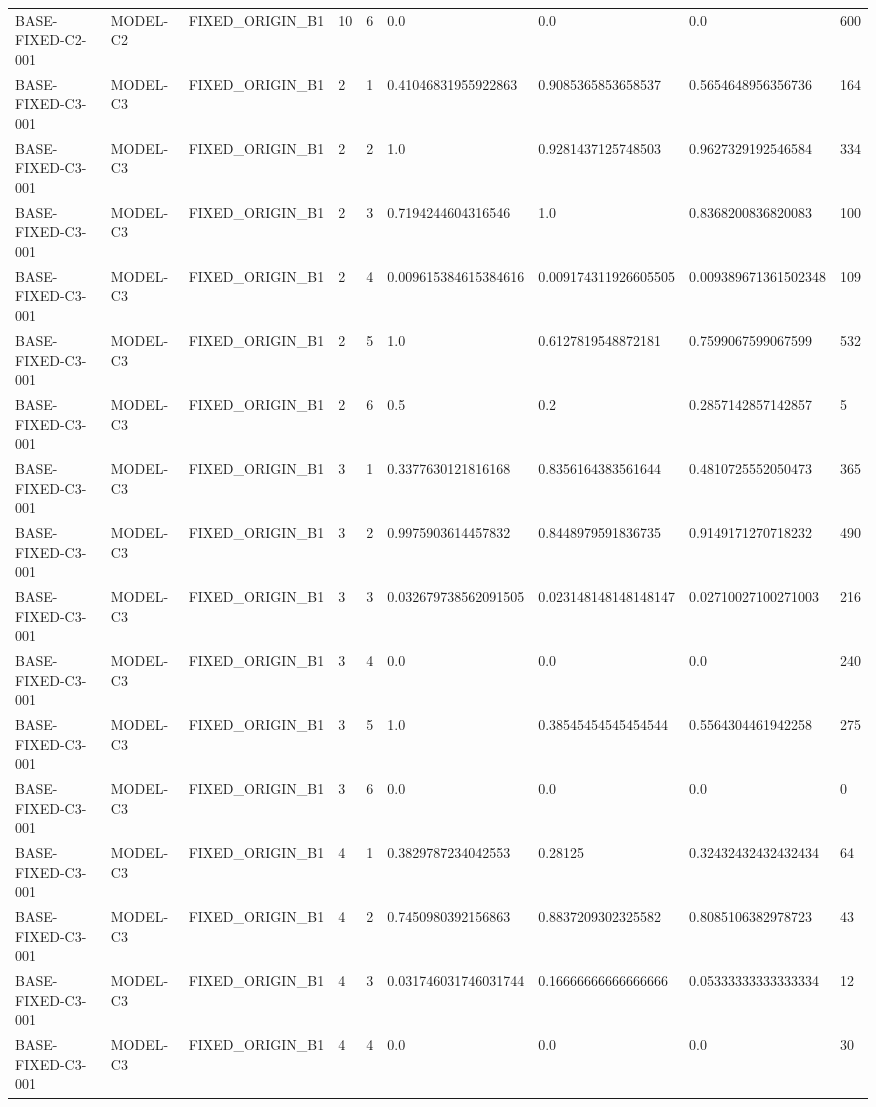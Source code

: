 \begin{tabular}{lllllllll}
BASE-FIXED-C2-001 & MODEL-C2 & FIXED\_ORIGIN\_B1 & 10 & 6 & 0.0 & 0.0 & 0.0 & 600 \\
BASE-FIXED-C3-001 & MODEL-C3 & FIXED\_ORIGIN\_B1 & 2 & 1 & 0.41046831955922863 & 0.9085365853658537 & 0.5654648956356736 & 164 \\
BASE-FIXED-C3-001 & MODEL-C3 & FIXED\_ORIGIN\_B1 & 2 & 2 & 1.0 & 0.9281437125748503 & 0.9627329192546584 & 334 \\
BASE-FIXED-C3-001 & MODEL-C3 & FIXED\_ORIGIN\_B1 & 2 & 3 & 0.7194244604316546 & 1.0 & 0.8368200836820083 & 100 \\
BASE-FIXED-C3-001 & MODEL-C3 & FIXED\_ORIGIN\_B1 & 2 & 4 & 0.009615384615384616 & 0.009174311926605505 & 0.009389671361502348 & 109 \\
BASE-FIXED-C3-001 & MODEL-C3 & FIXED\_ORIGIN\_B1 & 2 & 5 & 1.0 & 0.6127819548872181 & 0.7599067599067599 & 532 \\
BASE-FIXED-C3-001 & MODEL-C3 & FIXED\_ORIGIN\_B1 & 2 & 6 & 0.5 & 0.2 & 0.2857142857142857 & 5 \\
BASE-FIXED-C3-001 & MODEL-C3 & FIXED\_ORIGIN\_B1 & 3 & 1 & 0.3377630121816168 & 0.8356164383561644 & 0.4810725552050473 & 365 \\
BASE-FIXED-C3-001 & MODEL-C3 & FIXED\_ORIGIN\_B1 & 3 & 2 & 0.9975903614457832 & 0.8448979591836735 & 0.9149171270718232 & 490 \\
BASE-FIXED-C3-001 & MODEL-C3 & FIXED\_ORIGIN\_B1 & 3 & 3 & 0.032679738562091505 & 0.023148148148148147 & 0.02710027100271003 & 216 \\
BASE-FIXED-C3-001 & MODEL-C3 & FIXED\_ORIGIN\_B1 & 3 & 4 & 0.0 & 0.0 & 0.0 & 240 \\
BASE-FIXED-C3-001 & MODEL-C3 & FIXED\_ORIGIN\_B1 & 3 & 5 & 1.0 & 0.38545454545454544 & 0.5564304461942258 & 275 \\
BASE-FIXED-C3-001 & MODEL-C3 & FIXED\_ORIGIN\_B1 & 3 & 6 & 0.0 & 0.0 & 0.0 & 0 \\
BASE-FIXED-C3-001 & MODEL-C3 & FIXED\_ORIGIN\_B1 & 4 & 1 & 0.3829787234042553 & 0.28125 & 0.32432432432432434 & 64 \\
BASE-FIXED-C3-001 & MODEL-C3 & FIXED\_ORIGIN\_B1 & 4 & 2 & 0.7450980392156863 & 0.8837209302325582 & 0.8085106382978723 & 43 \\
BASE-FIXED-C3-001 & MODEL-C3 & FIXED\_ORIGIN\_B1 & 4 & 3 & 0.031746031746031744 & 0.16666666666666666 & 0.05333333333333334 & 12 \\
BASE-FIXED-C3-001 & MODEL-C3 & FIXED\_ORIGIN\_B1 & 4 & 4 & 0.0 & 0.0 & 0.0 & 30 \\

\end{tabular}
